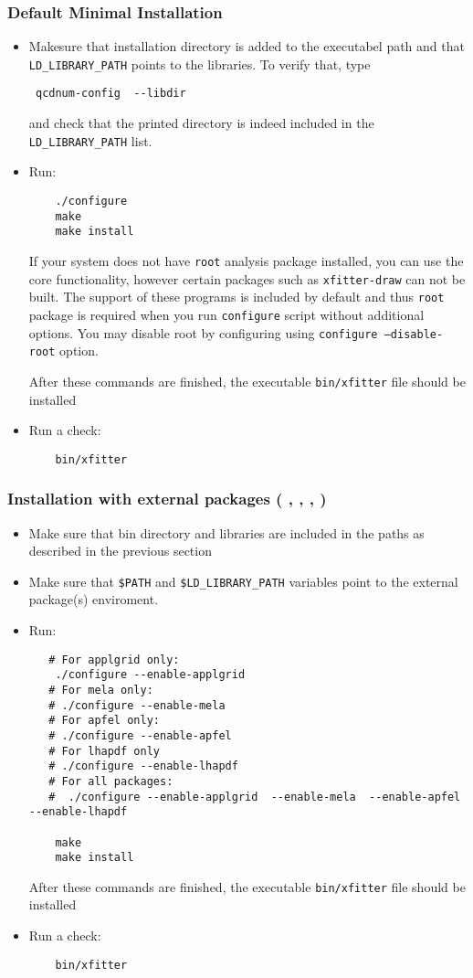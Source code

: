 \subsubsection{Default Minimal Installation}
\begin{itemize}
\item
 Makesure that \qcdnum installation directory is added to the executabel
 path and that {\tt LD\_LIBRARY\_PATH} points to the \qcdnum libraries.
 To verify that, type
\begin{verbatim}
 qcdnum-config  --libdir
\end{verbatim}
and check that the printed directory is indeed included in the {\tt LD\_LIBRARY\_PATH} list.

\item Run:
\begin{verbatim}
    ./configure
    make 
    make install
\end{verbatim}
If your system does not have {\tt root} analysis package installed, you can use the {\fitter} core functionality, however certain packages such as {\tt xfitter-draw} 
can not be built. The support of these programs is included by default and thus 
{\tt root} package is required when you run {\tt configure} script without 
additional options. You may disable root by configuring using 
{\tt configure --disable-root} option.


After these commands are finished, the executable {\tt bin/xfitter} 
file should be installed
\item  Run a check:
\begin{verbatim}
    bin/xfitter 
\end{verbatim}
\end{itemize}
\subsubsection{Installation with external packages
( \applgrid, \apfel, \mela, \lhapdf )}
\begin{itemize}
\item Make sure that \qcdnum bin directory and libraries are included
in the paths as described in the previous section
\item Make sure that {\tt \$PATH} and {\tt \$LD\_LIBRARY\_PATH} 
variables point to the external package(s) enviroment.
\item Run:
\begin{verbatim}
   # For applgrid only:
    ./configure --enable-applgrid 
   # For mela only:  
   # ./configure --enable-mela 
   # For apfel only:
   # ./configure --enable-apfel
   # For lhapdf only 
   # ./configure --enable-lhapdf
   # For all packages:
   #  ./configure --enable-applgrid  --enable-mela  --enable-apfel  --enable-lhapdf

    make 
    make install
\end{verbatim}
After these commands are finished, the executable {\tt bin/xfitter} 
file should be installed
\item  Run a check:
\begin{verbatim}
    bin/xfitter 
\end{verbatim}
\end{itemize}


